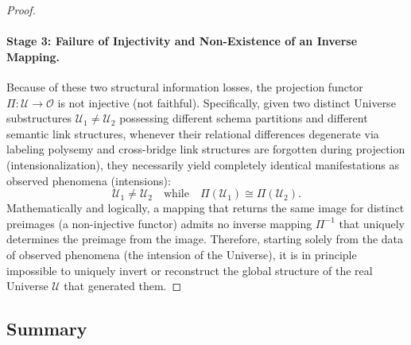 \documentclass[11pt,a4paper]{article}
\theoremstyle{definition}
\theoremstyle{plain}
\begin{document}
\begin{proof}
\paragraph{Stage 3: Failure of Injectivity and Non-Existence of an Inverse Mapping.}
Because of these two structural information losses, the projection functor $\Pi: \mathcal{U} \to \mathcal{O}$ is not injective (not faithful). Specifically, given two distinct Universe substructures $\mathcal{U}_1 \neq \mathcal{U}_2$ possessing different schema partitions and different semantic link structures, whenever their relational differences degenerate via labeling polysemy and cross-bridge link structures are forgotten during projection (intensionalization), they necessarily yield completely identical manifestations as observed phenomena (intensions):
\begin{equation*}
\mathcal{U}_{1} \neq \mathcal{U}_{2} \quad \text{while} \quad \Pi(\mathcal{U}_{1}) \cong \Pi(\mathcal{U}_{2}).
\end{equation*}
Mathematically and logically, a mapping that returns the same image for distinct preimages (a non-injective functor) admits no inverse mapping $\Pi^{-1}$ that uniquely determines the preimage from the image. Therefore, starting solely from the data of observed phenomena (the intension of the Universe), it is in principle impossible to uniquely invert or reconstruct the global structure of the real Universe $\mathcal{U}$ that generated them.
\end{proof}
\subsection*{Summary}
\end{document}
